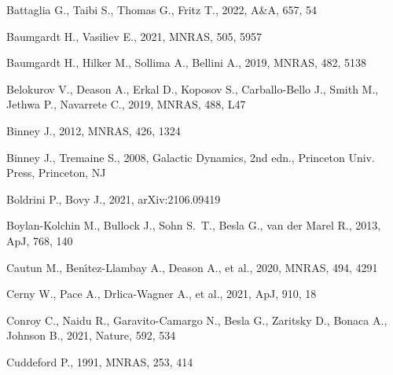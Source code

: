\documentclass[usenatbib,fleqn]{mnras}
\begin{document}
\begin{thebibliography}{}

Battaglia G., Taibi S., Thomas G., Fritz T., 2022, A\&A, 657, 54

Baumgardt H., Vasiliev E., 2021, MNRAS, 505, 5957

Baumgardt H., Hilker M., Sollima A., Bellini A., 2019, MNRAS, 482, 5138

Belokurov V., Deason A., Erkal D., Koposov S., Carballo-Bello J., Smith M., Jethwa P., Navarrete C., 2019, MNRAS, 488, L47

Binney J., 2012, MNRAS, 426, 1324

Binney J., Tremaine S., 2008, Galactic Dynamics, 2nd edn., Princeton Univ. Press, Princeton, NJ


Boldrini P., Bovy J., 2021, arXiv:2106.09419

Boylan-Kolchin M., Bullock J., Sohn S.~T., Besla G., van der Marel R., 2013, ApJ, 768, 140


Cautun M., Ben\'\i tez-Llambay A., Deason A., et al., 2020, MNRAS, 494, 4291

Cerny W., Pace A., Drlica-Wagner A., et al., 2021, ApJ, 910, 18

Conroy C., Naidu R., Garavito-Camargo N., Besla G., Zaritsky D., Bonaca A., Johnson B., 2021, Nature, 592, 534

Cuddeford P., 1991, MNRAS, 253, 414


\end{thebibliography}
\end{document}
